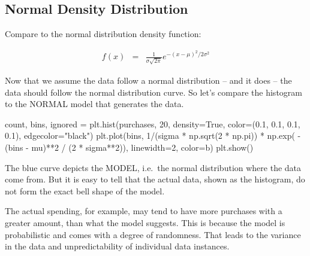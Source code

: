 \documentclass[
  letterpaper,
]{scrbook}
\newenvironment{Shaded}{\begin{snugshade}}{\end{snugshade}}
\newcommand{\DecValTok}[1]{\textcolor[rgb]{0.68,0.00,0.00}{#1}}
\newcommand{\FloatTok}[1]{\textcolor[rgb]{0.68,0.00,0.00}{#1}}
\newcommand{\NormalTok}[1]{\textcolor[rgb]{0.00,0.23,0.31}{#1}}
\newcommand{\OperatorTok}[1]{\textcolor[rgb]{0.37,0.37,0.37}{#1}}
\newcommand{\StringTok}[1]{\textcolor[rgb]{0.13,0.47,0.30}{#1}}
\newcommand{\VariableTok}[1]{\textcolor[rgb]{0.07,0.07,0.07}{#1}}
\begin{document}
\subsection*{Normal Density
Distribution}\label{normal-density-distribution}

Compare to the normal distribution density function:

\begin{eqnarray}
f(x) & = & \frac{1}{\sigma \sqrt{2\pi}} e^{- \left( {x - \mu } \right)^2 / 2\sigma^2}
\end{eqnarray}

Now that we assume the data follow a normal distribution -- and it does
-- the data should follow the normal distribution curve. So let's
compare the histogram to the NORMAL model that generates the data.

\begin{Shaded}
\begin{Highlighting}[]
\NormalTok{count, bins, ignored }\OperatorTok{=}\NormalTok{ plt.hist(purchases, }\DecValTok{20}\NormalTok{, density}\OperatorTok{=}\VariableTok{True}\NormalTok{, color}\OperatorTok{=}\NormalTok{(}\FloatTok{0.1}\NormalTok{, }\FloatTok{0.1}\NormalTok{, }\FloatTok{0.1}\NormalTok{, }\FloatTok{0.1}\NormalTok{), edgecolor}\OperatorTok{=}\StringTok{"black"}\NormalTok{)}
\NormalTok{plt.plot(bins, }\DecValTok{1}\OperatorTok{/}\NormalTok{(sigma }\OperatorTok{*}\NormalTok{ np.sqrt(}\DecValTok{2} \OperatorTok{*}\NormalTok{ np.pi)) }\OperatorTok{*}
\NormalTok{                np.exp( }\OperatorTok{{-}}\NormalTok{ (bins }\OperatorTok{{-}}\NormalTok{ mu)}\OperatorTok{**}\DecValTok{2} \OperatorTok{/}\NormalTok{ (}\DecValTok{2} \OperatorTok{*}\NormalTok{ sigma}\OperatorTok{**}\DecValTok{2}\NormalTok{)),}
\NormalTok{                linewidth}\OperatorTok{=}\DecValTok{2}\NormalTok{, color}\OperatorTok{=}\StringTok{\textquotesingle{}b\textquotesingle{}}\NormalTok{)}
\NormalTok{plt.show()}
\end{Highlighting}
\end{Shaded}

The blue curve depicts the MODEL, i.e.~the normal distribution where the
data come from. But it is easy to tell that the actual data, shown as
the histogram, do not form the exact bell shape of the model.

The actual spending, for example, may tend to have more purchases with a
greater amount, than what the model suggests. This is because the model
is probabilistic and comes with a degree of randomness. That leads to
the variance in the data and unpredictability of individual data
instances.
\end{document}
